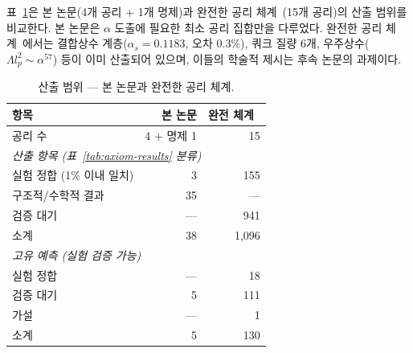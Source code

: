 \documentclass[entropy,article,submit,pdftex,oneauthor]{Definitions/mdpi}
\begin{document}
표~\ref{tab:scope}은 본 논문(4개 공리 + 1개 명제)과 완전한 공리 체계~\cite{han2026}(15개 공리)의 산출 범위를 비교한다. 본 논문은 $\alpha$ 도출에 필요한 최소 공리 집합만을 다루었다. 완전한 공리 체계~\cite{han2026}에서는 결합상수 계층($\alpha_s = 0.1183$, 오차 $0.3\%$), 쿼크 질량 6개, 우주상수($\Lambda l_p^2 \sim \alpha^{57}$) 등이 이미 산출되어 있으며, 이들의 학술적 제시는 후속 논문의 과제이다.

\begin{table}[H]
\caption{산출 범위 --- 본 논문과 완전한 공리 체계.\label{tab:scope}}
\begin{tabular}{lrr}
\toprule
\textbf{항목} & \textbf{본 논문} & \textbf{완전 체계~\cite{han2026}} \\
\midrule
공리 수 & 4 + 명제 1 & 15 \\
\midrule
\multicolumn{3}{l}{\emph{산출 항목 (표~\ref{tab:axiom-results} 분류)}} \\
\quad 실험 정합 (1\% 이내 일치) & 3 & 155 \\
\quad 구조적/수학적 결과 & 35 & --- \\
\quad 검증 대기 & --- & 941 \\
\quad 소계 & 38 & 1,096 \\
\midrule
\multicolumn{3}{l}{\emph{고유 예측 (실험 검증 가능)}} \\
\quad 실험 정합 & --- & 18 \\
\quad 검증 대기 & 5 & 111 \\
\quad 가설 & --- & 1 \\
\quad 소계 & 5 & 130 \\
\bottomrule
\end{tabular}
\end{table}

\vspace{6pt}






\end{document}
